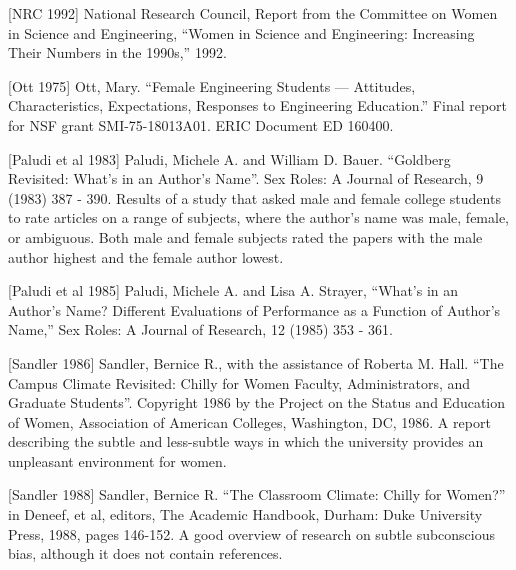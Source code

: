 {[NRC 1992]  National Research Council, Report from the Committee on Women 
in Science and Engineering, 
``Women in Science and Engineering: Increasing Their Numbers in the 
1990s,'' 
1992.


[Ott 1975]          Ott, Mary. ``Female Engineering Students  ---  Attitudes,  Characteristics,
                    Expectations, Responses to Engineering Education.'' Final report for NSF
                    grant SMI-75-18013A01. ERIC Document ED 160400.


[Paludi et al 1983] Paludi,      Michele     A.     and
                    William D. Bauer. ``Goldberg Revisited:  What's in an Author's Name''.
                    Sex Roles:  A Journal of Research, 9
                    (1983) 387 - 390. Results of a study that
                    asked male and female college students to
                    rate articles on a range of subjects, where
                    the author's name was male, female, or
                    ambiguous. Both male and female subjects rated the papers with the male author highest and the female author lowest.


[Paludi et al 1985] Paludi, Michele A. and Lisa A. Strayer,
                    ``What's in an Author's Name?  Different Evaluations of Performance as
                    a Function of Author's Name,''  Sex
                    Roles:   A  Journal  of  Research,  12
                    (1985) 353 - 361.



[Sandler 1986]      Sandler,  Bernice R.,  with the assistance of Roberta M. Hall. ``The Campus  Climate  Revisited:   Chilly  for
                    Women Faculty, Administrators, and
                    Graduate Students''. Copyright 1986
                    by  the  Project  on  the  Status  and
                    Education of Women, Association of
                    American Colleges, Washington, DC,
                    1986. A report describing the subtle and
                    less-subtle ways in which the university
                    provides an unpleasant environment for
                    women.


[Sandler 1988]      Sandler, Bernice R. ``The Classroom
                    Climate:   Chilly  for  Women?''   in
                    Deneef, et al, editors, The Academic
                    Handbook, Durham:  Duke University
                    Press,  1988,  pages 146-152. A good
                    overview of research on subtle subconscious bias, although it does not contain
                    references.


}
